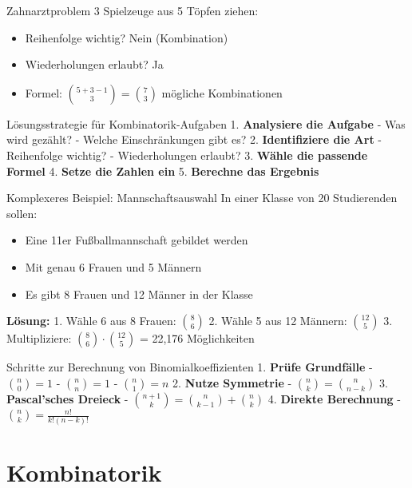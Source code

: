 \begin{example}{Zahnarztproblem}
3 Spielzeuge aus 5 Töpfen ziehen:
\begin{itemize}
\item Reihenfolge wichtig? Nein (Kombination)
\item Wiederholungen erlaubt? Ja
\item Formel: $\binom{5+3-1}{3} = \binom{7}{3}$ mögliche Kombinationen
\end{itemize}
\end{example}

\begin{KR}{Lösungsstrategie für Kombinatorik-Aufgaben}
1. \textbf{Analysiere die Aufgabe}
   - Was wird gezählt?
   - Welche Einschränkungen gibt es?
2. \textbf{Identifiziere die Art}
   - Reihenfolge wichtig?
   - Wiederholungen erlaubt?
3. \textbf{Wähle die passende Formel}
4. \textbf{Setze die Zahlen ein}
5. \textbf{Berechne das Ergebnis}
\end{KR}

\begin{example}{Komplexeres Beispiel: Mannschaftsauswahl}
In einer Klasse von 20 Studierenden sollen:
\begin{itemize}
\item Eine 11er Fußballmannschaft gebildet werden
\item Mit genau 6 Frauen und 5 Männern
\item Es gibt 8 Frauen und 12 Männer in der Klasse
\end{itemize}

\textbf{Lösung:}
1. Wähle 6 aus 8 Frauen: $\binom{8}{6}$
2. Wähle 5 aus 12 Männern: $\binom{12}{5}$
3. Multipliziere: $\binom{8}{6} \cdot \binom{12}{5}$ = 22,176 Möglichkeiten
\end{example}

\begin{KR}{Schritte zur Berechnung von Binomialkoeffizienten}
1. \textbf{Prüfe Grundfälle}
   - $\binom{n}{0} = 1$
   - $\binom{n}{n} = 1$
   - $\binom{n}{1} = n$
2. \textbf{Nutze Symmetrie}
   - $\binom{n}{k} = \binom{n}{n-k}$
3. \textbf{Pascal'sches Dreieck}
   - $\binom{n+1}{k} = \binom{n}{k-1} + \binom{n}{k}$
4. \textbf{Direkte Berechnung}
   - $\binom{n}{k} = \frac{n!}{k!(n-k)!}$
\end{KR}

\section{Kombinatorik}





